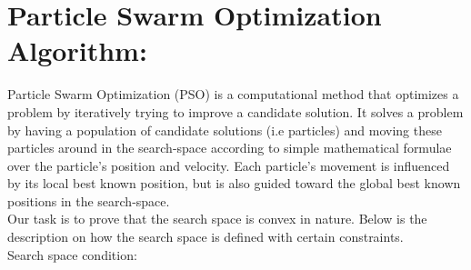 \documentclass{article}
\begin{document}
\begin{comment}
		\hline
		Photo-voltaic Panels & Photo-voltaic panels, through photoelectric phenomenon, produce electricity in a direct electricity generation way. Solar energy is energy supplied by nature therefore free and abundant.  PV panels can provide an effective solution during energy demand.  & These provide the available power generated from the solar energy to a phase in which the EV will be charged  \\ 
		\hline
		Batteries & Li-ion battery don’t require maintenance to ensure their performance. Provides high energy density. The rate of self-discharge is less compared to other rechargeable cells such as Ni-Cad and NiMH forms  & These are used to store the energy which is not used during the day in off peak period and is used to charge the EV or to discharge it to the grid.  \\
		\hline
		User & User has to leave the house on the specified departure time with the specified SOC level & Provides arrival/departure time of EV’s and SOC level to be obtained \\ 
		\hline
		Market & Obtains the energy market price & Provides the price list to controller. \\
		\hline
		
	\end{tabular}
	\caption{SGAM Function layer}
	\label{table:6} 
\end{table}
\end{comment} 
\newpage
\section{Particle Swarm Optimization Algorithm:}
Particle Swarm Optimization (PSO) is a computational method that optimizes a problem by iteratively trying to improve a candidate solution. It solves a problem by having a population of candidate solutions (i.e particles) and moving these particles around in the search-space according to simple mathematical formulae over the particle's position and velocity. Each particle's movement is influenced by its local best known position, but is also guided toward the global best known positions in the search-space.\\[0.2cm]
Our task is to prove that the search space is convex in nature. Below is the description on how the search space is defined with certain constraints.\\[0.3cm]
Search space condition:
 
\end{document}
